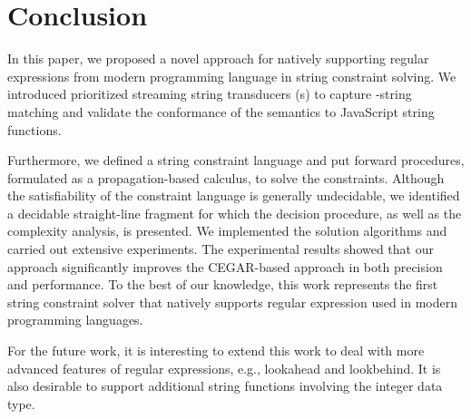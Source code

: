 
\section{Conclusion}\label{sec-related}



 


In this paper, we proposed a novel approach for natively supporting regular expressions from modern programming language in string constraint solving. We introduced prioritized streaming string transducers ({\PSST}s) to capture \regexp-string matching and validate the conformance of the semantics to JavaScript string functions.   

Furthermore, we defined a string constraint language and put forward procedures, formulated as a propagation-based calculus, to solve the constraints. Although the satisfiability of the constraint language is generally undecidable, we identified a decidable straight-line fragment for which the decision procedure, as well as the complexity analysis, is presented.  
%
We implemented the solution algorithms and carried out extensive experiments. The experimental results showed that our approach significantly improves the CEGAR-based approach in both precision and performance. To the best of our knowledge, this work represents the first string constraint solver that natively supports regular expression used in modern programming languages. 

For the future work, it is interesting to extend this work to deal with more advanced features of regular expressions, e.g., lookahead and lookbehind. It is also desirable to support additional string functions involving the integer data type. %

